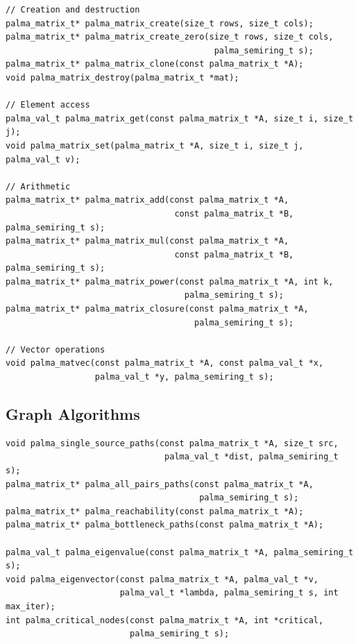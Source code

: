 \documentclass[11pt,a4paper]{article}
\theoremstyle{plain}
\theoremstyle{definition}
\begin{document}
\begin{lstlisting}[caption={Matrix operation signatures}]
// Creation and destruction
palma_matrix_t* palma_matrix_create(size_t rows, size_t cols);
palma_matrix_t* palma_matrix_create_zero(size_t rows, size_t cols, 
                                          palma_semiring_t s);
palma_matrix_t* palma_matrix_clone(const palma_matrix_t *A);
void palma_matrix_destroy(palma_matrix_t *mat);

// Element access
palma_val_t palma_matrix_get(const palma_matrix_t *A, size_t i, size_t j);
void palma_matrix_set(palma_matrix_t *A, size_t i, size_t j, palma_val_t v);

// Arithmetic
palma_matrix_t* palma_matrix_add(const palma_matrix_t *A, 
                                  const palma_matrix_t *B, palma_semiring_t s);
palma_matrix_t* palma_matrix_mul(const palma_matrix_t *A,
                                  const palma_matrix_t *B, palma_semiring_t s);
palma_matrix_t* palma_matrix_power(const palma_matrix_t *A, int k, 
                                    palma_semiring_t s);
palma_matrix_t* palma_matrix_closure(const palma_matrix_t *A, 
                                      palma_semiring_t s);

// Vector operations
void palma_matvec(const palma_matrix_t *A, const palma_val_t *x,
                  palma_val_t *y, palma_semiring_t s);
\end{lstlisting}

\subsection{Graph Algorithms}

\begin{lstlisting}[caption={Graph algorithm signatures}]
void palma_single_source_paths(const palma_matrix_t *A, size_t src,
                                palma_val_t *dist, palma_semiring_t s);
palma_matrix_t* palma_all_pairs_paths(const palma_matrix_t *A, 
                                       palma_semiring_t s);
palma_matrix_t* palma_reachability(const palma_matrix_t *A);
palma_matrix_t* palma_bottleneck_paths(const palma_matrix_t *A);

palma_val_t palma_eigenvalue(const palma_matrix_t *A, palma_semiring_t s);
void palma_eigenvector(const palma_matrix_t *A, palma_val_t *v,
                       palma_val_t *lambda, palma_semiring_t s, int max_iter);
int palma_critical_nodes(const palma_matrix_t *A, int *critical, 
                         palma_semiring_t s);
\end{lstlisting}
\end{document}

